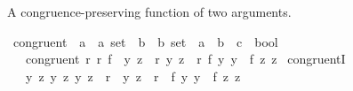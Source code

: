 \begin{isabellebody}
\isamarkupfalse%
%
\endisatagproof
{\isafoldproof}%
%
\isadelimproof
%
\endisadelimproof
%
\isadelimdocument
%
\endisadelimdocument
%
\isatagdocument
%
\isamarkuptrue%
%
\endisatagdocument
{\isafolddocument}%
%
\isadelimdocument
%
\endisadelimdocument
%
\begin{isamarkuptext}%
A congruence-preserving function of two arguments.%
\end{isamarkuptext}\isamarkuptrue%
\isamarkupfalse%
\ congruent{}\ {\isacharcolon}{\kern0pt}{\isacharcolon}{\kern0pt}\ {\isachardoublequoteopen}{\isacharparenleft}{\kern0pt}{\isacharprime}{\kern0pt}a\ {\isasymtimes}\ {\isacharprime}{\kern0pt}a{\isacharparenright}{\kern0pt}\ set\ {\isasymRightarrow}\ {\isacharparenleft}{\kern0pt}{\isacharprime}{\kern0pt}b\ {\isasymtimes}\ {\isacharprime}{\kern0pt}b{\isacharparenright}{\kern0pt}\ set\ {\isasymRightarrow}\ {\isacharparenleft}{\kern0pt}{\isacharprime}{\kern0pt}a\ {\isasymRightarrow}\ {\isacharprime}{\kern0pt}b\ {\isasymRightarrow}\ {\isacharprime}{\kern0pt}c{\isacharparenright}{\kern0pt}\ {\isasymRightarrow}\ bool{\isachardoublequoteclose}\isanewline
\ \ \ {\isachardoublequoteopen}congruent{}\ r{}\ r{}\ f\ {\isasymlongleftrightarrow}\ {\isacharparenleft}{\kern0pt}{\isasymforall}{\isacharparenleft}{\kern0pt}y{}{\isacharcomma}{\kern0pt}\ z{}{\isacharparenright}{\kern0pt}\ {\isasymin}\ r{}{\isachardot}{\kern0pt}\ {\isasymforall}{\isacharparenleft}{\kern0pt}y{}{\isacharcomma}{\kern0pt}\ z{}{\isacharparenright}{\kern0pt}\ {\isasymin}\ r{}{\isachardot}{\kern0pt}\ f\ y{}\ y{}\ {\isacharequal}{\kern0pt}\ f\ z{}\ z{}{\isacharparenright}{\kern0pt}{\isachardoublequoteclose}\isanewline
\isanewline
{}\isamarkupfalse%
\ congruent{}I{\isacharprime}{\kern0pt}{\isacharcolon}{\kern0pt}\isanewline
\ \ \ {\isachardoublequoteopen}{\isasymAnd}y{}\ z{}\ y{}\ z{}{\isachardot}{\kern0pt}\ {\isacharparenleft}{\kern0pt}y{}{\isacharcomma}{\kern0pt}\ z{}{\isacharparenright}{\kern0pt}\ {\isasymin}\ r{}\ {\isasymLongrightarrow}\ {\isacharparenleft}{\kern0pt}y{}{\isacharcomma}{\kern0pt}\ z{}{\isacharparenright}{\kern0pt}\ {\isasymin}\ r{}\ {\isasymLongrightarrow}\ f\ y{}\ y{}\ {\isacharequal}{\kern0pt}\ f\ z{}\ z{}{\isachardoublequoteclose}\isanewline

\end{isabellebody}
